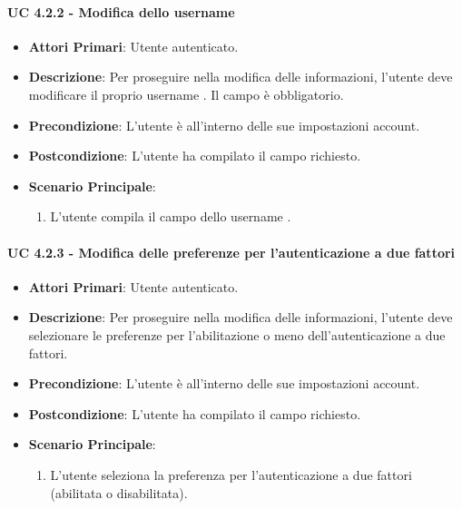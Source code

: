 				\paragraph{UC 4.2.2 - Modifica dello username }
				\begin{itemize}
					\item \textbf{Attori Primari}: Utente autenticato.
					\item \textbf{Descrizione}: Per proseguire nella modifica delle informazioni, l'utente deve modificare il proprio username . Il campo è obbligatorio.
					\item \textbf{Precondizione}: L'utente è all'interno delle sue impostazioni account.
					\item \textbf{Postcondizione}: L'utente ha compilato il campo richiesto.
					\item \textbf{Scenario Principale}:
					\begin{enumerate}
						\item L'utente compila il campo dello username .
					\end{enumerate}
				\end{itemize}

				\paragraph{UC 4.2.3 - Modifica delle preferenze per l'autenticazione a due fattori}
				\begin{itemize}
					\item \textbf{Attori Primari}: Utente autenticato.
					\item \textbf{Descrizione}: Per proseguire nella modifica delle informazioni, l'utente deve selezionare le preferenze per l'abilitazione o meno dell'autenticazione a due fattori.
					\item \textbf{Precondizione}: L'utente è all'interno delle sue impostazioni account.
					\item \textbf{Postcondizione}: L'utente ha compilato il campo richiesto.
					\item \textbf{Scenario Principale}:
					\begin{enumerate}
						\item L'utente seleziona la preferenza per l'autenticazione a due fattori (abilitata o disabilitata).
					\end{enumerate}
				\end{itemize}


